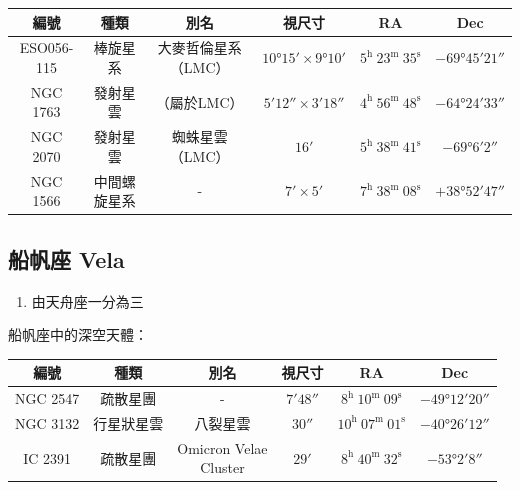 \begin{center}
\begin{longtable}{c | c | c | c | c | c}
    編號 & 種類 & 別名 & 視尺寸 & RA & Dec \\
    \hline
    \endfirsthead


    \endfoot

    \endlastfoot

    ESO056-115 & 棒旋星系 & 大麥哲倫星系（LMC） & \(\ang{10;15}\times\ang{9;10}\) & \(5^\text{h }23^\text{m }35^\text{s}\) & \(-\ang{69;45;21}\)\\
    NGC 1763 & 發射星雲 & （屬於LMC） & \(\ang{;5;12}\times\ang{;3;18}\) & \(4^\text{h }56^\text{m }48^\text{s}\) & \(-\ang{64;24;33}\) \\
    NGC 2070 & 發射星雲 & 蜘蛛星雲（LMC） & \(\ang{;16;}\) & \(5^\text{h }38^\text{m }41^\text{s}\) & \(-\ang{69;6;2}\)\\
    NGC 1566 & 中間螺旋星系 & - & \(\ang{;7;}\times\ang{;5;}\) & \(7^\text{h }38^\text{m }08^\text{s}\) & \(+\ang{38;52;47}\) \\
\end{longtable}
\end{center}

\subsection{船帆座 Vela}
\begin{enumerate}
    \item 由天舟座一分為三
\end{enumerate}
船帆座中的深空天體：
\begin{center}
\begin{longtable}{c | c | c | c | c | c}
    編號 & 種類 & 別名 & 視尺寸 & RA & Dec \\
    \hline
    \endfirsthead


    \endfoot

    \endlastfoot

    NGC 2547 & 疏散星團 & - & \(\ang{;7;48}\) & \(8^\text{h }10^\text{m }09^\text{s}\) & \(-\ang{49;12;20}\) \\
    NGC 3132 & 行星狀星雲 & 八裂星雲 & \(\ang{;;30}\) & \(10^\text{h }07^\text{m }01^\text{s}\) & \(-\ang{40;26;12}\) \\
    IC 2391 & 疏散星團 & \makecell{Omicron Velae\\Cluster} & \(\ang{;29;}\) & \(8^\text{h }40^\text{m }32^\text{s}\) & \(-\ang{53;2;8}\)
\end{longtable}
\end{center}

